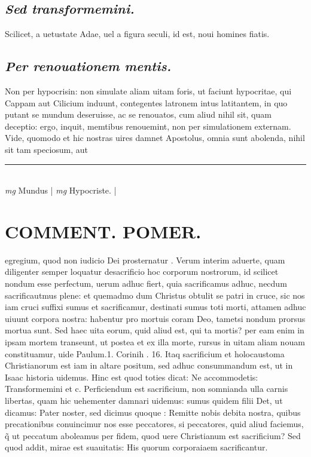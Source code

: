 \documentclass{article}
\begin{document}
\begin{pages}
\subsection*{\textit{Sed transformemini. }}\pstart Scilicet, a uetustate Adae, uel a figura seculi, id est, noui homines fiatis.  \pend
{}
{}
\subsection*{\textit{Per renouationem mentis. }}\pstart Non per hypocrisin: non simulate aliam uitam foris, ut faciunt hypocritae, qui Cappam aut Cilicium induunt, contegentes latronem intus latitantem, in quo putant se mundum deseruisse, ac se renouatos, cum aliud nihil sit, quam deceptio: ergo, inquit, memtibus renouemint, non per simulationem externam. Vide, quomodo et hic nostras uires damnet Apostolus, omnia sunt abolenda, nihil sit tam speciosum, aut  \pend
\vspace{0.5cm}\noindent
\vspace{0.2cm}\rule{1cm}{0.2pt}\\ 
\hspace{0.2cm}\textit{mg}
\footnotesize Mundus
\normalsize| 
\hspace{0.2cm}\textit{mg}
\footnotesize Hypocriste. 
\normalsize| 
\section*{COMMENT. POMER.  }\pstart egregium, quod non iudicio Dei prosternatur . Verum interim aduerte, quam diligenter semper loquatur desacrificio hoc corporum nostrorum, id scilicet nondum esse perfectum, uerum adhuc fiert, quia sacrificamus adhuc, necdum sacrificautmus plene: et quemadmo dum Christus obtulit se patri in cruce, sic nos iam cruci suffixi sumus et sacrificamur, destinati sumus toti morti, attamen adhuc uiuunt corpora nostra: habentur pro mortuis coram Deo, tametsi nondum prorsus mortua sunt. Sed haec uita eorum, quid aliud est, qui ta mortis? per eam enim in ipsam mortem transeunt, ut postea et ex illa morte, rursus in uitam aliam nouam constituamur, uide Paulum.1. Corinih . 16.  Itaq sacrificium et holocaustoma Christianorum est iam in altare positum, sed adhuc consummandum est, ut in Isaac historia uidemus. Hinc est quod toties dicat: Ne accommodetis: Transformemini et c. Perficiendum est sacrificium, non somnianda ulla carnis libertas, quam hic uehementer damnari uidemus: sumus quidem filii Det, ut dicamus: Pater noster, sed dicimus quoque : Remitte nobis debita nostra, quibus precationibus conuincimur nos esse peccatores, si peccatores, quid aliud faciemus, q̃ ut peccatum aboleamus per fidem, quod uere Christianum est sacrificium? Sed quod addit, mirae est suauitatis: His quorum corporaiaem sacrificantur.  \pend
{}
{}

\end{pages}
\end{document}
